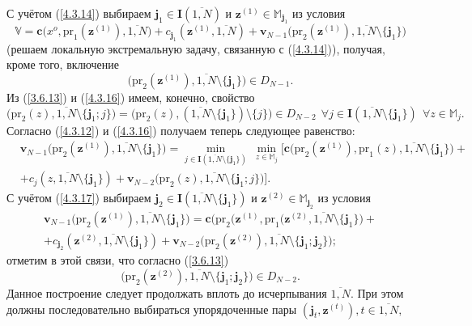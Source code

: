 \documentclass[12pt,twoside]{report}
\newcommand{\bfn}{\begin{equation}}
\newcommand{\efn}{\end{equation}}
\newcommand{\ov}{\overline}
\newcommand{\sm}{\setminus}
\newcommand{\fa}{\forall}
\newcommand{\bbm}{{\mathbb M}}
\begin{document}
{С учётом (\ref{4.3.14}) выбираем $\mathbf{j}_1\in \mathbf{I}(\ov{1,N})$ и
$\mathbf{z}^{(1)}\in \bbm_{\mathbf{j}_1}$ из условия
\bfn\label{4.3.15}
\mathbb{V}= \mathbf{c}\bigl(x^o,\mathrm{pr}_1(\mathbf{z}^{(1)}),\ov{1,N}\bigl) +
c_{\mathbf{j}_1}(\mathbf{z}^{(1)},\ov{1,N}) + \mathbf{v}_{N-1}
\bigl(\mathrm{pr}_2(\mathbf{z}^{(1)}),\ov{1,N}\sm\{\mathbf{j}_1\}\bigl)
\efn
(решаем локальную экстремальную задачу, связанную с (\ref{4.3.14})),
получая, кроме того, включение
\bfn\label{4.3.16}
\bigl(\mathrm{pr}_2(\mathbf{z}^{(1)}),\ov{1,N}\sm\{\mathbf{j}_1\}\bigl)\in D_{N-1}.
\efn
Из (\ref{3.6.13}) и (\ref{4.3.16}) имеем, конечно, свойство
$$
\bigl(\mathrm{pr}_2(z),\ov{1,N}\sm\{\mathbf{j}_1;j\}\bigl) =
\bigl(\mathrm{pr}_2(z),(\ov{1,N}\sm
\{\mathbf{j}_1\})\sm\{j\}\bigl)\in D_{N-2}\ \ \fa j\in
\mathbf{I}(\ov{1,N}\sm\{\mathbf{j}_1\})\
\ \fa z\in \bbm_j.
$$
Согласно (\ref{4.3.12}) и (\ref{4.3.16}) получаем теперь следующее равенство:
\begin{eqnarray}
&\mathbf{v}_{N-1}\bigl(\mathrm{pr}_2(\mathbf{z}^{(1)}),\ov{1,N}\sm\{\mathbf{j}_1\}
\bigl)=\min\limits_{j\in\mathbf{I}(\ov{1,N}\sm\{\mathbf{j}_1\})}\
\min\limits_{z\in\bbm_j}\bigl[\mathbf{c}\bigl(\mathrm{pr}_2(\mathbf{z}^{(1)}),\mathrm{pr}_1(z),
\ov{1,N}\sm \{\mathbf{j}_1\}\bigl) +
&\nonumber\\
&+ c_j(z,\ov{1,N}\sm\{\mathbf{j}_1\}) +
\mathbf{v}_{N-2}\bigl(\mathrm{pr}_2(z),\ov{1,N}\sm\{\mathbf{j}_1;j\}\bigl)\bigl].
&\label{4.3.17}
\end{eqnarray}
С учётом (\ref{4.3.17}) выбираем $\mathbf{j}_2\in \mathbf{I}(\ov{1,N}\sm
\{\mathbf{j}_1\})$ и $\mathbf{z}^{(2)}\in \bbm_{\mathbf{j}_2}$ из условия
\begin{eqnarray}
&\mathbf{v}_{N-1}\bigl(\mathrm{pr}_2(\mathbf{z}^{(1)}),\ov{1,N}\sm\{\mathbf{j}_1\}
\bigl) = \mathbf{c}\bigl(\mathrm{pr}_2(\mathbf{z}^{(1)}, \mathrm{pr}_1(\mathbf{z}^{(2)},\ov{1,N}\sm
\{\mathbf{j}_1\}\bigl) +
&\nonumber\\
&+ c_{\mathbf{j}_2}(\mathbf{z}^{(2)}, \ov{1,N}\sm\{\mathbf{j}_1\}) +
\mathbf{v}_{N-2}\bigl(\mathrm{pr}_2(\mathbf{z}^{(2)}),\ov{1,N}\sm\{\mathbf{j}_1;\mathbf{j}_2\}\bigl);
&\label{4.3.18}
\end{eqnarray}
отметим в этой связи, что согласно (\ref{3.6.13})
$$\bigl(\mathrm{pr}_2(\mathbf{z}^{(2)}),\ov{1,N}\sm\{\mathbf{j}_1;\mathbf{j}_2\}\bigl)\in D_{N-2}.
$$
Данное построение следует продолжать вплоть до исчерпывания $\ov{1,N}.$ При этом должны
последовательно выбираться упорядоченные пары $(\mathbf{j}_t,\mathbf{z}^{(t)}), t\in \ov{1,N},$
}
\end{document}
